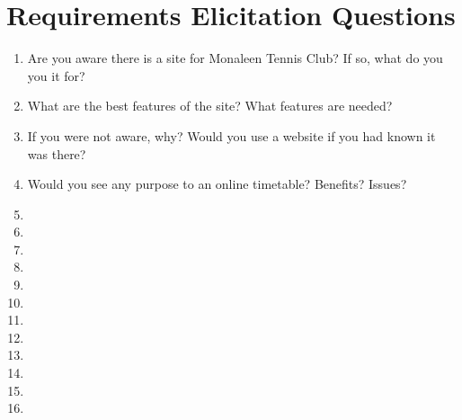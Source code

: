 \section{Requirements Elicitation Questions}
\label{sec:regquestions}

\begin{enumerate}
\item Are you aware there is a site for Monaleen Tennis Club? If so, what do you you it for?
\item What are the best features of the site? What features are needed?
\item If you were not aware, why? Would you use a website if you had known it was there?
\item Would you see any purpose to an online timetable? Benefits? Issues?
\item
\item 
\item 
\item 
\item 
\item 
\item 
\item 
\item 
\item 
\item 
\item  
\end{enumerate}

